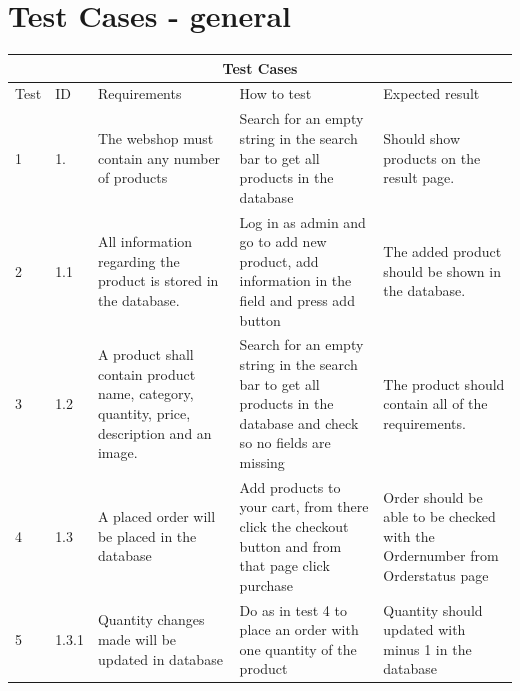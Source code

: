 \documentclass[a4paper,12pt]{article}
\begin{document}
\section{Test Cases - general}
\begin{tabular}{ |p{0.8cm}|p{0.8cm}|p{3.8cm}|p{3.8cm}|p{3.8cm}|  }
	\hline
	\multicolumn{5}{|c|}{Test Cases} \\
	\hline
	Test& ID & Requirements &How to test&Expected result\\
	\hline
	1 & 1. & The webshop must contain any number of products    & Search for an empty string in the search bar to get all products in the database & Should show products on the result page.\\
	\hline
	2  & 1.1 &All information regarding the product is stored in the database.   & Log in as admin and go to add new product, add information in the field and press add button & The added product should be shown in the database.\\
	\hline
	3 & 1.2 &A product shall contain product name, category, quantity, price, description and an image.    &Search for an empty string in the search bar to get all products in the database and check so no fields are missing & The product should contain all of the requirements.\\
	\hline
	4 & 1.3 & A placed order will be placed in the database  & Add products to your cart, from there click the checkout button and from that page click purchase  & Order should be able to be checked with the Ordernumber from Orderstatus page \\
	\hline
	5 & 1.3.1& Quantity changes made will be updated in database& Do as in test 4 to place an order with one quantity of the product & Quantity should updated with minus 1 in the database\\
	\hline

	
	
	
\end{tabular}
	\newpage
\end{document}
